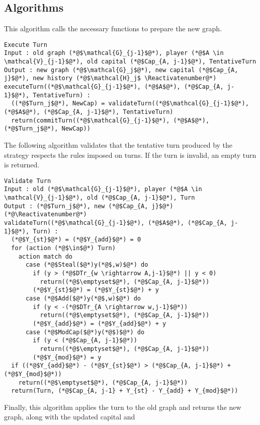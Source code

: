 \documentclass[11pt]{llncs}
\makeatletter
\newcommand*\Suppressnumber{%
  \lst@AddToHook{OnNewLine}{%
    \let\thelstnumber\relax%
     \advance\c@lstnumber-\@ne\relax%
    }%
}
\theoremstyle{definition}
\makeatother
\begin{document}
  \subsection{Algorithms}
    This algorithm calls the necessary functions to prepare the new graph.
    \Suppressnumber
    \begin{lstlisting}[label=executeturn, style=numbers]
Execute Turn
Input : old graph (*@$\mathcal{G}_{j-1}$@*), player (*@$A \in \mathcal{V}_{j-1}$@*), old capital (*@$Cap_{A, j-1}$@*), TentativeTurn
Output : new graph (*@$\mathcal{G}_j$@*), new capital (*@$Cap_{A, j}$@*), new history (*@$\mathcal{H}_j$ \Reactivatenumber@*)
executeTurn((*@$\mathcal{G}_{j-1}$@*), (*@$A$@*), (*@$Cap_{A, j-1}$@*), TentativeTurn) :
  ((*@$Turn_j$@*), NewCap) = validateTurn((*@$\mathcal{G}_{j-1}$@*), (*@$A$@*), (*@$Cap_{A, j-1}$@*), TentativeTurn)
  return(commitTurn((*@$\mathcal{G}_{j-1}$@*), (*@$A$@*), (*@$Turn_j$@*), NewCap))
    \end{lstlisting}
    The following algorithm validates that the tentative turn produced by the strategy respects the rules imposed on turns.
    If the turn is invalid, an empty turn is returned.
    \Suppressnumber
    \begin{lstlisting}[label=validateturn, style=numbers]
Validate Turn
Input : old (*@$\mathcal{G}_{j-1}$@*), player (*@$A \in \mathcal{V}_{j-1}$@*), old (*@$Cap_{A, j-1}$@*), Turn
Output : (*@$Turn_j$@*), new (*@$Cap_{A, j}$@*) (*@\Reactivatenumber@*)
validateTurn((*@$\mathcal{G}_{j-1}$@*), (*@$A$@*), (*@$Cap_{A, j-1}$@*), Turn) :
  (*@$Y_{st}$@*) = (*@$Y_{add}$@*) = 0
  for (action (*@$\in$@*) Turn)
    action match do
      case (*@$Steal($@*)y(*@$,w)$@*) do
        if (y > (*@$DTr_{w \rightarrow A,j-1}$@*) || y < 0)
          return((*@$\emptyset$@*), (*@$Cap_{A, j-1}$@*))
        (*@$Y_{st}$@*) = (*@$Y_{st}$@*) + y
      case (*@$Add($@*)y(*@$,w)$@*) do
        if (y < -(*@$DTr_{A \rightarrow w,j-1}$@*))
          return((*@$\emptyset$@*), (*@$Cap_{A, j-1}$@*))
        (*@$Y_{add}$@*) = (*@$Y_{add}$@*) + y
      case (*@$ModCap($@*)y(*@$)$@*) do
        if (y < (*@$Cap_{A, j-1}$@*))
          return((*@$\emptyset$@*), (*@$Cap_{A, j-1}$@*))
        (*@$Y_{mod}$@*) = y
  if ((*@$Y_{add}$@*) - (*@$Y_{st}$@*) > (*@$Cap_{A, j-1}$@*) + (*@$Y_{mod}$@*))
    return((*@$\emptyset$@*), (*@$Cap_{A, j-1}$@*))
  return(Turn, (*@$Cap_{A, j-1} + Y_{st} - Y_{add} + Y_{mod}$@*))
    \end{lstlisting}
    Finally, this algorithm applies the turn to the old graph and returns the new graph, along with the updated capital and
\end{document}
